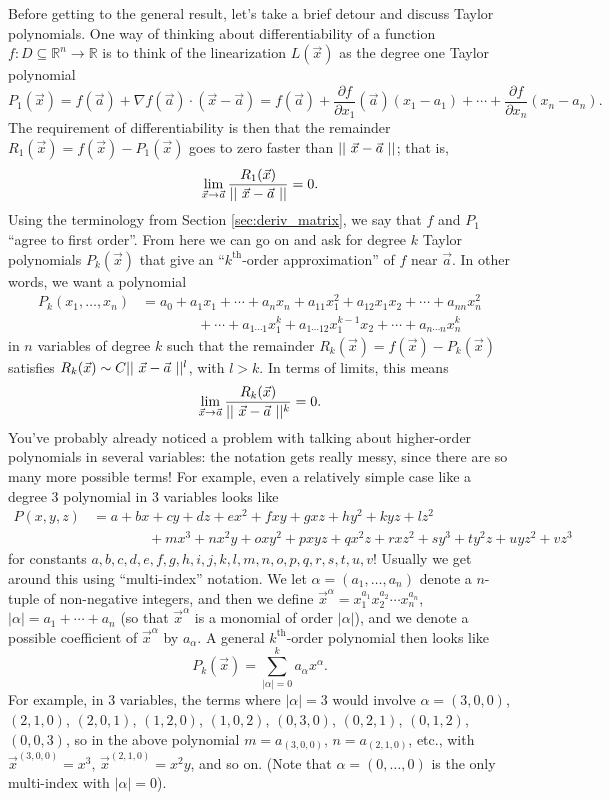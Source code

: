 Before getting to the general result, let's take a brief detour and discuss Taylor polynomials. One way of thinking about differentiability of a function $f:D\subseteq\mathbb{R}^n\to\mathbb{R}$ is to think of the linearization $L(\vec{x})$ as the degree one Taylor polynomial
\[
 P_1(\vec{x}) = f(\vec{a})+\nabla f(\vec{a})\cdot(\vec{x}-\vec{a}) = f(\vec{a})+ \frac{\partial f}{\partial x_1}(\vec{a})(x_1-a_1)+\cdots + \frac{\partial f}{\partial x_n}(x_n-a_n).
\]
The requirement of differentiability is then that the remainder $R_1(\vec{x}) = f(\vec{x})-P_1(\vec{x})$ goes to zero faster than $||\ \vec{x}-\vec{a}\ ||$; that is,
\[
 \lim_{\vec{x}\to\vec{a}}\frac{R_1(\vec{x})}{||\ \vec{x}-\vec{a}\ ||}=0.
\]
Using the terminology from Section \ref{sec:deriv_matrix}, we say that $f$ and $P_1$ ``agree to first order''. From here we can go on and ask for degree $k$ Taylor polynomials $P_k(\vec{x})$ that give an ``$k^{\textrm{th}}$-order approximation'' of $f$ near $\vec{a}$. In other words, we want a polynomial
\begin{align*}
 P_k(x_1,\ldots, x_n) &= a_0 +a_{1}x_1+\cdots+a_{n}x_n+a_{11}x_1^2+a_{12}x_1x_2+\cdots+a_{nn}x_n^2\\
&\quad\quad\quad\quad +\cdots+a_{1\cdots 1}x_1^k+a_{1\cdots 12}x_1^{k-1}x_2+\cdots+a_{n\cdots n}x_n^k
\end{align*}
in $n$ variables of degree $k$ such that the remainder $R_k(\vec{x}) = f(\vec{x})-P_k(\vec{x})$ satisfies $R_k(\vec{x})\sim C||\ \vec{x}-\vec{a}\ ||^l$, with $l>k$. In terms of limits, this means
\[
 \lim_{\vec{x}\to\vec{a}}\frac{R_k(\vec{x})}{||\ \vec{x}-\vec{a}\ ||^k}=0.
\]
You've probably already noticed a problem with talking about higher-order polynomials in several variables: the notation gets really messy, since there are so many more possible terms! For example, even a relatively simple case like a degree 3 polynomial in 3 variables looks like
\begin{align*}
 P(x,y,z) &= a+bx+cy+dz+ex^2+fxy+gxz+hy^2+kyz+lz^2\\
&\quad\quad\quad\quad +mx^3+nx^2y+oxy^2+pxyz+qx^2z+rxz^2+sy^3+ty^2z+uyz^2+vz^3
\end{align*}
for constants $a,b,c,d,e,f,g,h,i,j,k,l,m,n,o,p,q,r,s,t,u,v$! Usually we get around this using ``multi-index'' notation. We let $\alpha=(a_1,\ldots, a_n)$ denote a $n$-tuple of non-negative integers, and then we define $\vec{x}^\alpha = x_1^{a_1}x_2^{a_2}\cdots x_n^{a_n}$, $\lvert\alpha\rvert=a_1+\cdots +a_n$ (so that $\vec{x}^\alpha$ is a monomial of order $\lvert\alpha\rvert$),  and we denote a possible coefficient of $\vec{x}^\alpha$ by $a_\alpha$. A general $k^{\text{th}}$-order polynomial then looks like
\[
 P_k(\vec{x}) = \sum_{\lvert\alpha\rvert=0}^k a_\alpha x^\alpha.
\]
For example, in 3 variables, the terms where $\lvert\alpha\rvert=3$ would involve $\alpha = (3,0,0)$, $(2,1,0)$, $(2,0,1)$, $(1,2,0)$, $(1,0,2)$, $(0,3,0)$, $(0,2,1)$, $(0,1,2)$, $(0,0,3)$, so in the above polynomial $m=a_{(3,0,0)},\, n = a_{(2,1,0)}$, etc., with $\vec{x}^{(3,0,0)} = x^3,\, \vec{x}^{(2,1,0)} = x^2y$, and so on. (Note that $\alpha = (0,\ldots, 0)$ is the only multi-index with $\lvert\alpha\rvert=0$). 

